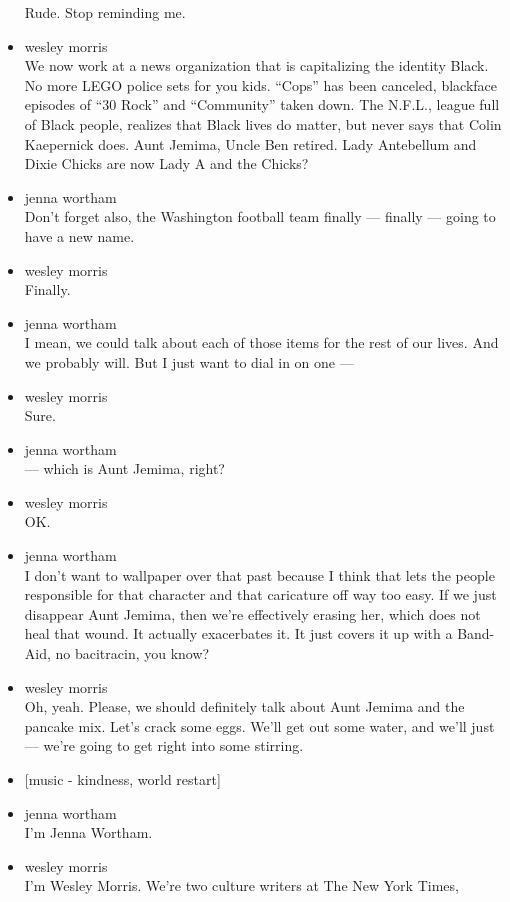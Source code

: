 \begin{itemize}
  Rude. Stop reminding me.
\item
  wesley morris\\
  We now work at a news organization that is capitalizing the identity
  Black. No more LEGO police sets for you kids. ``Cops'' has been
  canceled, blackface episodes of ``30 Rock'' and ``Community'' taken
  down. The N.F.L., league full of Black people, realizes that Black
  lives do matter, but never says that Colin Kaepernick does. Aunt
  Jemima, Uncle Ben retired. Lady Antebellum and Dixie Chicks are now
  Lady A and the Chicks?
\item
  jenna wortham\\
  Don't forget also, the Washington football team finally --- finally
  --- going to have a new name.
\item
  wesley morris\\
  Finally.
\item
  jenna wortham\\
  I mean, we could talk about each of those items for the rest of our
  lives. And we probably will. But I just want to dial in on one ---
\item
  wesley morris\\
  Sure.
\item
  jenna wortham\\
  --- which is Aunt Jemima, right?
\item
  wesley morris\\
  OK.
\item
  jenna wortham\\
  I don't want to wallpaper over that past because I think that lets the
  people responsible for that character and that caricature off way too
  easy. If we just disappear Aunt Jemima, then we're effectively erasing
  her, which does not heal that wound. It actually exacerbates it. It
  just covers it up with a Band-Aid, no bacitracin, you know?
\item
  wesley morris\\
  Oh, yeah. Please, we should definitely talk about Aunt Jemima and the
  pancake mix. Let's crack some eggs. We'll get out some water, and
  we'll just --- we're going to get right into some stirring.
\item
  {[}music - kindness, world restart{]}
\item
  jenna wortham\\
  I'm Jenna Wortham.
\item
  wesley morris\\
  I'm Wesley Morris. We're two culture writers at The New York Times,

\end{itemize}
